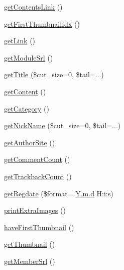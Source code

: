 \begin{DoxyCompactItemize}
\item 
\hyperlink{classcontentItem_a80a161de842f1a890fdbfee439674881}{get\+Contents\+Link} ()
\item 
\hyperlink{classcontentItem_a0de8d1dad2347b9f91bc4f16df2c4a12}{get\+First\+Thumbnail\+Idx} ()
\item 
\hyperlink{classcontentItem_a8e5d8c09bab20f5a0cd0874504cf5a5e}{get\+Link} ()
\item 
\hyperlink{classcontentItem_a62686ab7afb76f1239a3824be0e2ded8}{get\+Module\+Srl} ()
\item 
\hyperlink{classcontentItem_aa061be1a76a2d94912440572bd4f875a}{get\+Title} (\$cut\+\_\+size=0, \$tail=\textquotesingle{}...\textquotesingle{})
\item 
\hyperlink{classcontentItem_adb35fd4206e162bccd6ff9f5ac832e09}{get\+Content} ()
\item 
\hyperlink{classcontentItem_ae5a4e97f8f472805fff31340bc095ff3}{get\+Category} ()
\item 
\hyperlink{classcontentItem_a16947acbbeff208471271acd16d5f8f1}{get\+Nick\+Name} (\$cut\+\_\+size=0, \$tail=\textquotesingle{}...\textquotesingle{})
\item 
\hyperlink{classcontentItem_ac8050edaeafe9d6a9c3017185a60576d}{get\+Author\+Site} ()
\item 
\hyperlink{classcontentItem_ae2402a7138ef2a2c9dae2d76aa31228f}{get\+Comment\+Count} ()
\item 
\hyperlink{classcontentItem_a197f56732733f1487d26ed23d29e94a6}{get\+Trackback\+Count} ()
\item 
\hyperlink{classcontentItem_a16a589406fd0206a40ec96810ec75ec1}{get\+Regdate} (\$format= \textquotesingle{}\hyperlink{xpresseditor_8min_8js_aa27188e30a5d2270a230edf44af69623}{Y.\+m.\+d} H\+:i\+:s\textquotesingle{})
\item 
\hyperlink{classcontentItem_acdff242f3298021a7ac9274a4191ebc7}{print\+Extra\+Images} ()
\item 
\hyperlink{classcontentItem_a9e7fa4b2b4b3ce4a066d89b7f862be5a}{have\+First\+Thumbnail} ()
\item 
\hyperlink{classcontentItem_a2d0ac2755de034bee02842e1b4b8179c}{get\+Thumbnail} ()
\item 
\hyperlink{classcontentItem_a3356fefc2abd34642fa229f5a150cbdd}{get\+Member\+Srl} ()
\end{DoxyCompactItemize}
